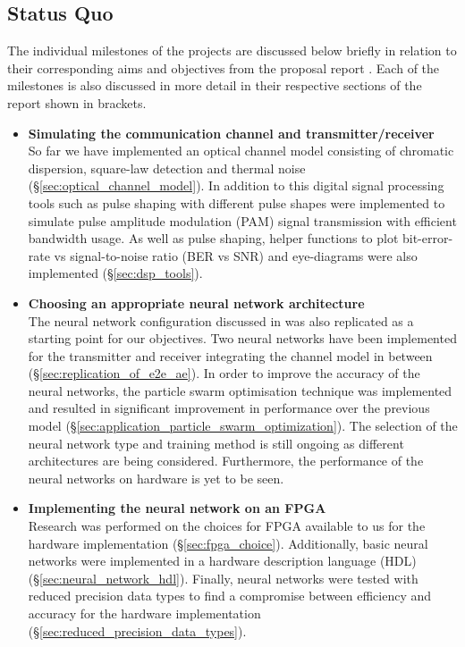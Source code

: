 
\iffalse


\fi

\subsection{Status Quo}

    The individual milestones of the projects are discussed below briefly in relation to their corresponding aims and objectives from the proposal report \autocite{proposal_report}. Each of the milestones is also discussed in more detail in their respective sections of the report shown in brackets.
    
    \begin{itemize}
        \item \textbf{Simulating the communication channel and transmitter/receiver}
        \\
        So far we have implemented an optical channel model consisting of chromatic dispersion, square-law detection and thermal noise (\S \ref{sec:optical_channel_model}). In addition to this digital signal processing tools such as pulse shaping with different pulse shapes were implemented to simulate pulse amplitude modulation (PAM) signal transmission with efficient bandwidth usage. As well as pulse shaping, helper functions to plot bit-error-rate vs signal-to-noise ratio (BER vs SNR) and eye-diagrams were also implemented (\S \ref{sec:dsp_tools}).
        
        \item \textbf{Choosing an appropriate neural network architecture}
        \\
        The neural network configuration discussed in \autocite{8433895} was also replicated as a starting point for our objectives. Two neural networks have been implemented for the transmitter and receiver integrating the channel model in between (\S \ref{sec:replication_of_e2e_ae}). In order to improve the accuracy of the neural networks, the particle swarm optimisation technique was implemented and resulted in significant improvement in performance over the previous model (\S \ref{sec:application_particle_swarm_optimization}). The selection of the neural network type and training method is still ongoing as different architectures are being considered. Furthermore, the performance of the neural networks on hardware is yet to be seen.
        
        \item \textbf{Implementing the neural network on an FPGA}
        \\
        Research was performed on the choices for FPGA available to us for the hardware implementation (\S \ref{sec:fpga_choice}). Additionally, basic neural networks were implemented in a hardware description language (HDL) (\S \ref{sec:neural_network_hdl}). Finally, neural networks were tested with reduced precision data types to find a compromise between efficiency and accuracy for the hardware implementation (\S \ref{sec:reduced_precision_data_types}).
    \end{itemize}
    
